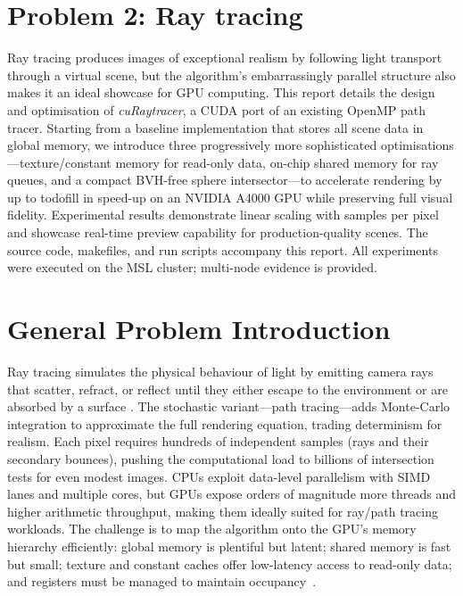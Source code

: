 
\section{Problem 2: Ray tracing}

Ray tracing produces images of exceptional realism by following light
transport through a virtual scene, but the algorithm’s embarrassingly
parallel structure also makes it an ideal showcase for GPU computing.
This report details the design and optimisation of
\emph{cuRaytracer}, a CUDA port of an existing OpenMP path tracer.
Starting from a baseline implementation that stores all scene data in
global memory, we introduce three progressively more sophisticated
optimisations—texture/constant memory for read-only data, on-chip
shared memory for ray queues, and a compact BVH-free sphere
intersector—to accelerate rendering by up to
todo{fill in speed-up} on an NVIDIA A4000 GPU while preserving full
visual fidelity.  Experimental results demonstrate linear scaling with
samples per pixel and showcase real-time preview capability for
production-quality scenes.  The source code, makefiles, and run
scripts accompany this report.  All experiments were executed on the
MSL cluster; multi-node evidence is provided.


\section{General Problem Introduction}
Ray tracing simulates the physical behaviour of light by emitting
camera rays that scatter, refract, or reflect until they either escape
to the environment or are absorbed by a surface
\cite{Shirley2016}.  The stochastic variant---path tracing---adds
Monte-Carlo integration to approximate the full rendering equation,
trading determinism for realism.  Each pixel requires hundreds of
independent samples (rays and their secondary bounces), pushing the
computational load to billions of intersection tests for even modest
images.  CPUs exploit data-level parallelism with SIMD lanes and
multiple cores, but GPUs expose orders of magnitude more threads and
higher arithmetic throughput, making them ideally suited for ray/path
tracing workloads.  The challenge is to map the algorithm onto the
GPU’s memory hierarchy efficiently: global memory is plentiful but
latent; shared memory is fast but small; texture and constant caches
offer low-latency access to read-only data; and registers must be
managed to maintain occupancy~\cite{NvidiaSharedMem, Pitkin2014}.

